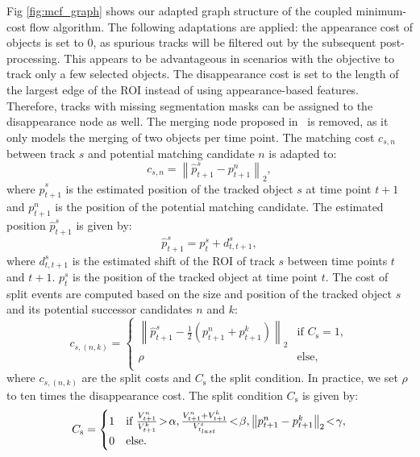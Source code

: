 \documentclass[10pt,letterpaper]{article}
\begin{document}
Fig \ref{fig:mcf_graph} shows our adapted graph structure of the coupled minimum-cost flow algorithm. The following adaptations are applied: the appearance cost of objects is set to 0, as spurious tracks will be filtered out by the subsequent post-processing. This appears to be advantageous in scenarios with the objective to track only a few selected objects. The disappearance cost is set to the length of the largest edge of the ROI instead of using appearance-based features. Therefore, tracks with missing segmentation masks can be assigned to the disappearance node as well. The merging node proposed in~\cite{Padfield2011} is removed, as it only models the merging of two objects per time point. The matching cost $c_{s,n}$ between track $s$ and potential matching candidate $n$ is adapted to: 
\begin{equation}
      c_{s,n}=\left\|\hat{p}^s_{t+1}-p^n_{t+1}\right\|_2,
\end{equation}
where $\hat{p}^s_{t+1}$ is the estimated position of the tracked object $s$ at time point $t+1$ and $p^n_{t+1}$ is the position of the potential matching candidate. The estimated position $\hat{p}^s_{t+1}$ is given by:  
\begin{equation}
    \hat{p}^s_{t+1}=p^s_{t}+d^s_{t,t+1},
\end{equation}
where $d^s_{t,t+1}$ is the estimated shift of the ROI of track $s$ between time points $t$ and $t+1$. $p^s_{t}$ is the position of the tracked object at time point $t$. The cost of split events are computed based on the size and position of the tracked object $s$ and its potential successor candidates $n$ and $k$:
\begin{equation}
     c_{s,(n,k)} = \begin{cases}
     \left\|\hat{p}^s_{t+1}-\frac{1}{2}(p^n_{t+1}+p^k_{t+1})\right\|_2 & \text{if } C_{\text{s}}=1,\\
    \rho & \text{else},\\
     \end{cases}
\end{equation}
where $c_{s,(n,k)}$ are the split costs and $C_{\text{s}}$ the split condition. In practice, we set $\rho$ to ten times the disappearance cost. The split condition $C_{\text{s}}$ is given by:
\begin{equation}
        C_{\text{s}} = \begin{cases} \small
        1 & \text{if } \frac{V^{n}_{t+1}}{V^{k}_{t+1}}\! >\! \alpha, \frac{V^n_{t+1}+V^k_{t+1}}{V^s_{t_{last}}}\! <\! \beta, \left\|p^{n}_{t+1}-p^{k}_{t+1}\right\|_2\! <\! \gamma,\\
        0 & \text{else}.
    \end{cases}
    \label{eq:split}
\end{equation}
\end{document}
